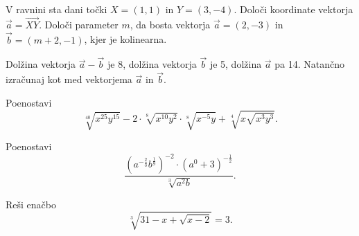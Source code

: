 \documentclass{izpit}
\begin{document}
\naloga[\tocke{5}]
  V ravnini sta dani točki $X=(1,1)$ in $Y=(3,-4)$.
  \podnaloga[1] Določi koordinate vektorja $\vec{a}=\vec{XY}$.
  \prostor[1]
  \podnaloga[1]
  Določi parameter $m$, da bosta vektorja $\vec{a}=(2,-3)$ in $\vec{b}=(m+2,-1)$, kjer je  kolinearna.
  \prostor[1]
  
\naloga*[\tocke{5}]
  Dolžina vektorja $\vec{a}-\vec{b}$ je 8, dolžina vektorja $\vec{b}$ je 5, dolžina $\vec{a}$ pa 14. Natančno izračunaj kot med vektorjema $\vec{a}$ in $\vec{b}$.
  \prostor[2]

\naloga[\tocke{4}]
  Poenostavi%
  \[\sqrt[40]{x^{25}y^{15}}-2\cdot \sqrt[8]{x^{10}y^{2}}\cdot\sqrt[8]{x^{-5}y}+\sqrt[4]{x\sqrt{x^3 y^3}}.\]
  \prostor[1]


\naloga*[\tocke{4}]%
  Poenostavi
  \[\frac{\left(a^{-\frac{2}{3}}b^{\frac{1}{9}}\right)^{-2}\cdot\left(a^0 +3\right)^{-\frac{1}{2}}}{\sqrt[3]{a^2 b}}.\]
  \prostor[1]

\naloga[\tocke{5}]
  Reši enačbo
  \[\sqrt[3]{31-x+\sqrt{x-2}}=3.\]
\end{document}
